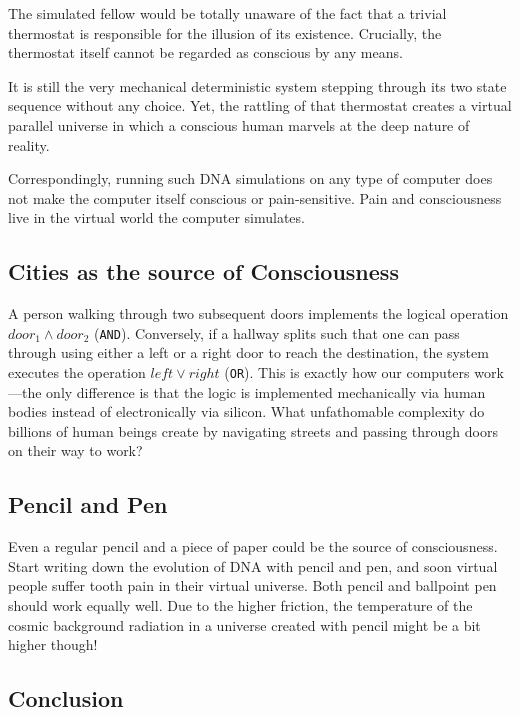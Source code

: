 The simulated fellow would be totally unaware of the fact that a trivial thermostat is responsible for the illusion of its existence.
Crucially, the thermostat itself cannot be regarded as conscious by any means. 

It is still the very mechanical deterministic system stepping through its two state sequence without any choice. Yet, the rattling of that thermostat creates a virtual parallel
universe in which a conscious human marvels at the deep nature of reality.

Correspondingly, running such DNA simulations on any type of computer does not make the computer itself conscious or pain-sensitive. Pain and consciousness live in
the virtual world the computer simulates.


\subsection*{Cities as the source of Consciousness}

A person walking through two subsequent doors implements the logical operation $door_{1} \land door_{2}$ (\texttt{AND}). Conversely, if a hallway splits such that one can pass through using either a left or a right door to reach the destination, the system executes the operation $left \lor right$ (\texttt{OR}). This is exactly how our computers work---the only difference is that the logic is implemented mechanically via human bodies instead of electronically via silicon. What unfathomable complexity do billions of human beings create by navigating streets and passing through doors on their way to work?

\subsection*{Pencil and Pen}

Even a regular pencil and a piece of paper could be the source of consciousness. Start writing down the evolution of DNA with pencil and pen, and soon virtual people suffer tooth pain in their virtual universe. Both pencil and ballpoint pen should work equally well. Due to the higher friction, the temperature of the cosmic background radiation in a universe created with pencil might be a bit higher though!


\subsection*{Conclusion}

